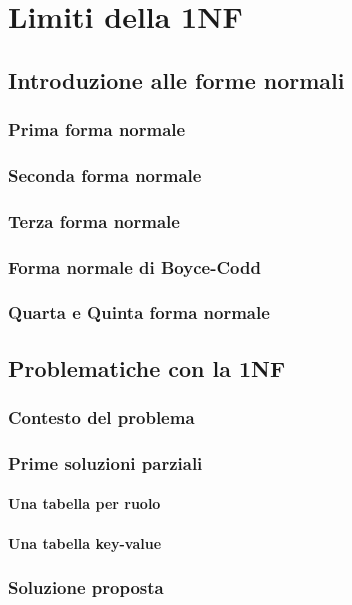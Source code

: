 \documentclass[b5paper,10pt,twoside,cucitura]{toptesi}
\begin{document}
\part{Limiti della 1NF}

\chapter{Introduzione alle forme normali}

\section{Prima forma normale}
\section{Seconda forma normale}
\section{Terza forma normale}
\section{Forma normale di Boyce-Codd}
\section{Quarta e Quinta forma normale}

\chapter{Problematiche con la 1NF}

\section{Contesto del problema}

\section{Prime soluzioni parziali}
\subsection{Una tabella per ruolo}
\subsection{Una tabella key-value}

\section{Soluzione proposta}
\end{document}
